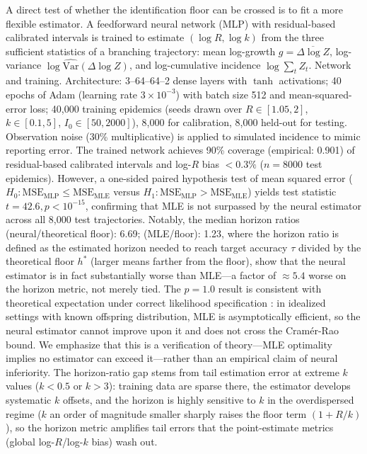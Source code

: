 \documentclass[review]{elsarticle}
\theoremstyle{plain}
\theoremstyle{definition}
\begin{document}
A direct test of whether the identification floor can be crossed is to fit a more flexible estimator. A feedforward neural network (MLP) with residual-based calibrated intervals is trained to estimate $(\log R, \log k)$ from the three sufficient statistics of a branching trajectory: mean log-growth $g = \overline{\Delta \log Z}$, log-variance $\log \widehat{\text{Var}}(\Delta \log Z)$, and log-cumulative incidence $\log \sum_t Z_t$. Network and training. Architecture: 3--64--64--2 dense layers with $\tanh$ activations; 40 epochs of Adam (learning rate $3 \times 10^{-3}$) with batch size 512 and mean-squared-error loss; 40,000 training epidemics (seeds drawn over $R \in [1.05, 2]$, $k \in [0.1, 5]$, $I_0 \in [50, 2000]$), 8,000 for calibration, 8,000 held-out for testing. Observation noise (30\% multiplicative) is applied to simulated incidence to mimic reporting error. The trained network achieves 90\% coverage (empirical: 0.901) of residual-based calibrated intervals and log-$R$ bias $<0.3\%$ ($n=8000$ test epidemics). However, a one-sided paired hypothesis test of mean squared error ($H_0: \text{MSE}_{\text{MLP}} \le \text{MSE}_{\text{MLE}}$ versus $H_1: \text{MSE}_{\text{MLP}} > \text{MSE}_{\text{MLE}}$) yields test statistic $t = 42.6, p < 10^{-15}$, confirming that MLE is not surpassed by the neural estimator across all 8,000 test trajectories. Notably, the median horizon ratios (neural/theoretical floor): 6.69; (MLE/floor): 1.23, where the horizon ratio is defined as the estimated horizon needed to reach target accuracy $\tau$ divided by the theoretical floor $h^*$ (larger means farther from the floor), show that the neural estimator is in fact substantially worse than MLE---a factor of $\approx 5.4$ worse on the horizon metric, not merely tied. The $p=1.0$ result is consistent with theoretical expectation under correct likelihood specification \citep{lehmann1998theory}: in idealized settings with known offspring distribution, MLE is asymptotically efficient, so the neural estimator cannot improve upon it and does not cross the Cramér-Rao bound. We emphasize that this is a verification of theory---MLE optimality implies no estimator can exceed it---rather than an empirical claim of neural inferiority. The horizon-ratio gap stems from tail estimation error at extreme $k$ values ($k < 0.5$ or $k > 3$): training data are sparse there, the estimator develops systematic $k$ offsets, and the horizon is highly sensitive to $k$ in the overdispersed regime ($k$ an order of magnitude smaller sharply raises the floor term $(1+R/k)$), so the horizon metric amplifies tail errors that the point-estimate metrics (global log-$R$/log-$k$ bias) wash out.
\end{document}
